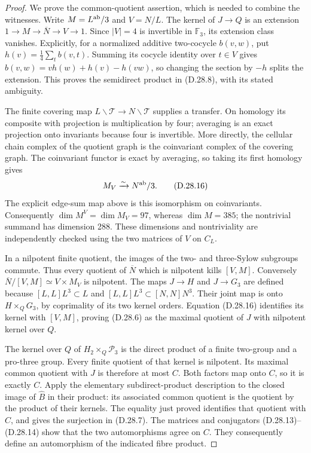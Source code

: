 \begin{proof}
We prove the common-quotient assertion, which is needed
to combine the witnesses. Write $M=L^{\rm ab}/3$ and
$V=N/L$. The kernel of $J\to Q$ is an extension
$1\to M\to\overline N\to V\to1$. Since $|V|=4$ is
invertible in $\mathbb F_3$, its extension class vanishes.
Explicitly, for a normalized additive two-cocycle
$b(v,w)$, put $h(v)=\frac14\sum_t b(v,t)$. Summing its
cocycle identity over $t\in V$ gives
$b(v,w)=vh(w)+h(v)-h(vw)$, so changing the section by
$-h$ splits the extension. This proves the semidirect
product in (D.28.8), with its stated ambiguity.

The finite covering map $L\backslash\mathcal T\to
N\backslash\mathcal T$ supplies a transfer. On homology
its composite with projection is multiplication by four;
averaging is an exact projection onto invariants because
four is invertible. More directly, the cellular chain
complex of the quotient graph is the coinvariant complex
of the covering graph. The coinvariant functor is exact
by averaging, so taking its first homology gives
\[
                 M_V\xrightarrow{\sim}N^{\rm ab}/3.
                                                               \tag{D.28.16}
\]
The explicit edge-sum map above is this isomorphism on
coinvariants. Consequently $\dim M^V=\dim M_V=97$,
whereas $\dim M=385$; the nontrivial summand has dimension
288. These dimensions and nontriviality are independently
checked using the two matrices of $V$ on $C_L$.

In a nilpotent finite quotient, the images of the two-
and three-Sylow subgroups commute. Thus every quotient
of $\overline N$ which is nilpotent kills $[V,M]$.
Conversely
$\overline N/[V,M]\simeq V\times M_V$ is nilpotent.
The maps $J\to H$ and $J\to G_3$ are defined because
$[L,L]L^3\subset L$ and $[L,L]L^3\subset[N,N]N^3$.
Their joint map is onto $H\times_QG_3$, by coprimality
of its two kernel orders. Equation (D.28.16) identifies
its kernel with $[V,M]$, proving (D.28.6) as the maximal
quotient of $J$ with nilpotent kernel over $Q$.

The kernel over $Q$ of
$H_2\times_Q\mathcal P_3$ is the direct product of a
finite two-group and a pro-three group. Every finite
quotient of that kernel is nilpotent. Its maximal common
quotient with $J$ is therefore at most $C$. Both factors
map onto $C$, so it is exactly $C$. Apply the elementary
subdirect-product description to the closed image of
$\widehat B$ in their product: its associated common
quotient is the quotient by the product of their kernels.
The equality just proved identifies that quotient with
$C$, and gives the surjection in (D.28.7).
The matrices and conjugators (D.28.13)--(D.28.14) show
that the two automorphisms agree on $C$. They consequently
define an automorphism of the indicated fibre product.


\end{proof}
